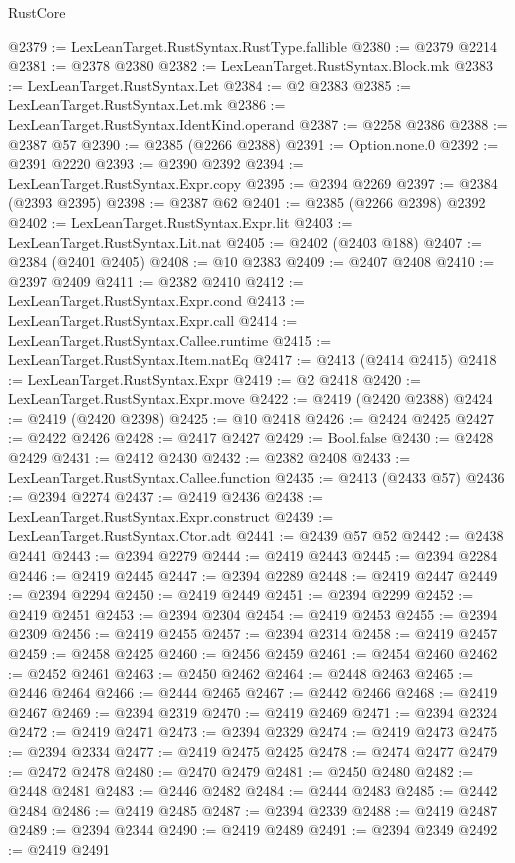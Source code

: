 \begin{lexlean}{RustCore}
\begin{coremodule}
@2379 := LexLeanTarget.RustSyntax.RustType.fallible
@2380 := @2379 @2214
@2381 := @2378 @2380
@2382 := LexLeanTarget.RustSyntax.Block.mk
@2383 := LexLeanTarget.RustSyntax.Let
@2384 := @2 @2383
@2385 := LexLeanTarget.RustSyntax.Let.mk
@2386 := LexLeanTarget.RustSyntax.IdentKind.operand
@2387 := @2258 @2386
@2388 := @2387 @57
@2390 := @2385 (@2266 @2388)
@2391 := Option.none.{0}
@2392 := @2391 @2220
@2393 := @2390 @2392
@2394 := LexLeanTarget.RustSyntax.Expr.copy
@2395 := @2394 @2269
@2397 := @2384 (@2393 @2395)
@2398 := @2387 @62
@2401 := @2385 (@2266 @2398) @2392
@2402 := LexLeanTarget.RustSyntax.Expr.lit
@2403 := LexLeanTarget.RustSyntax.Lit.nat
@2405 := @2402 (@2403 @188)
@2407 := @2384 (@2401 @2405)
@2408 := @10 @2383
@2409 := @2407 @2408
@2410 := @2397 @2409
@2411 := @2382 @2410
@2412 := LexLeanTarget.RustSyntax.Expr.cond
@2413 := LexLeanTarget.RustSyntax.Expr.call
@2414 := LexLeanTarget.RustSyntax.Callee.runtime
@2415 := LexLeanTarget.RustSyntax.Item.natEq
@2417 := @2413 (@2414 @2415)
@2418 := LexLeanTarget.RustSyntax.Expr
@2419 := @2 @2418
@2420 := LexLeanTarget.RustSyntax.Expr.move
@2422 := @2419 (@2420 @2388)
@2424 := @2419 (@2420 @2398)
@2425 := @10 @2418
@2426 := @2424 @2425
@2427 := @2422 @2426
@2428 := @2417 @2427
@2429 := Bool.false
@2430 := @2428 @2429
@2431 := @2412 @2430
@2432 := @2382 @2408
@2433 := LexLeanTarget.RustSyntax.Callee.function
@2435 := @2413 (@2433 @57)
@2436 := @2394 @2274
@2437 := @2419 @2436
@2438 := LexLeanTarget.RustSyntax.Expr.construct
@2439 := LexLeanTarget.RustSyntax.Ctor.adt
@2441 := @2439 @57 @52
@2442 := @2438 @2441
@2443 := @2394 @2279
@2444 := @2419 @2443
@2445 := @2394 @2284
@2446 := @2419 @2445
@2447 := @2394 @2289
@2448 := @2419 @2447
@2449 := @2394 @2294
@2450 := @2419 @2449
@2451 := @2394 @2299
@2452 := @2419 @2451
@2453 := @2394 @2304
@2454 := @2419 @2453
@2455 := @2394 @2309
@2456 := @2419 @2455
@2457 := @2394 @2314
@2458 := @2419 @2457
@2459 := @2458 @2425
@2460 := @2456 @2459
@2461 := @2454 @2460
@2462 := @2452 @2461
@2463 := @2450 @2462
@2464 := @2448 @2463
@2465 := @2446 @2464
@2466 := @2444 @2465
@2467 := @2442 @2466
@2468 := @2419 @2467
@2469 := @2394 @2319
@2470 := @2419 @2469
@2471 := @2394 @2324
@2472 := @2419 @2471
@2473 := @2394 @2329
@2474 := @2419 @2473
@2475 := @2394 @2334
@2477 := @2419 @2475 @2425
@2478 := @2474 @2477
@2479 := @2472 @2478
@2480 := @2470 @2479
@2481 := @2450 @2480
@2482 := @2448 @2481
@2483 := @2446 @2482
@2484 := @2444 @2483
@2485 := @2442 @2484
@2486 := @2419 @2485
@2487 := @2394 @2339
@2488 := @2419 @2487
@2489 := @2394 @2344
@2490 := @2419 @2489
@2491 := @2394 @2349
@2492 := @2419 @2491

\end{coremodule}
\end{lexlean}
